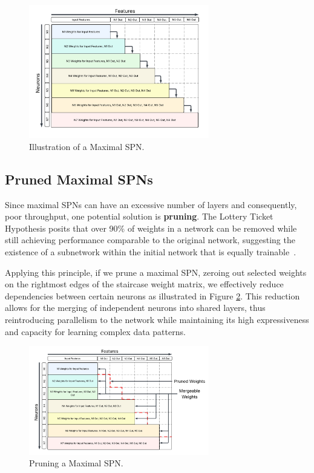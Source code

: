 \begin{figure}[h!]
\centering
\includegraphics[width=0.7\textwidth]{Figures/Methodology/Neuron_Based_Maximal_SPN_Weights.png}
\caption{Illustration of a Maximal SPN.}
\label{fig:maxSpn}
\end{figure}


\subsection{Pruned Maximal SPNs}

Since maximal SPNs can have an excessive number of layers and consequently, poor throughput, one potential solution is \textbf{pruning}. The Lottery Ticket Hypothesis posits that over 90\% of weights in a network can be removed while still achieving performance comparable to the original network, suggesting the existence of a subnetwork within the initial network that is equally trainable~\cite{frankle2018lottery}.

Applying this principle, if we prune a maximal SPN, zeroing out selected weights on the rightmost edges of the staircase weight matrix, we effectively reduce dependencies between certain neurons as illustrated in Figure \ref{fig:pruningMaxSPN}. This reduction allows for the merging of independent neurons into shared layers, thus reintroducing parallelism to the network while maintaining its high expressiveness and capacity for learning complex data patterns.

\begin{figure}[h!]
\centering
\includegraphics[width=0.7\textwidth]{Figures/Methodology/pruning_max_spn.png}
\caption{Pruning a Maximal SPN.}
\label{fig:pruningMaxSPN}
\end{figure}

